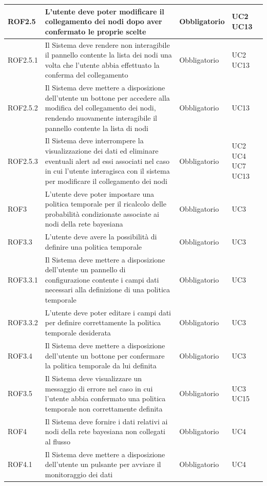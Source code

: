 \begin{center}
\begin{longtable}[c]{|m{}|m{}|m{}|m{}|}
\hline
ROF2.5 & L'utente deve poter modificare il collegamento dei nodi dopo aver confermato le proprie scelte & Obbligatorio & UC2 UC13\\
\hline
\rowcolor{grigio}ROF2.5.1 & Il Sistema deve rendere non interagibile il pannello contente la lista dei nodi una volta che l'utente abbia effettuato la conferma del collegamento & Obbligatorio & UC2 UC13\\
\hline
ROF2.5.2 & Il Sistema deve mettere a disposizione dell'utente un bottone per accedere alla modifica del collegamento dei nodi, rendendo nuovamente interagibile il pannello contente la lista di nodi & Obbligatorio & UC13\\
\hline
\rowcolor{grigio}ROF2.5.3 & Il Sistema deve interrompere la visualizzazione dei dati ed eliminare eventuali alert ad essi associati nel caso in cui l'utente interagisca con il sistema per modificare il collegamento dei nodi & Obbligatorio & UC2 UC4 UC7 UC13\\
\hline
ROF3 & L'utente deve poter impostare una politica temporale per il ricalcolo delle probabilità condizionate associate ai nodi della rete bayesiana & Obbligatorio & UC3\\
\hline
\rowcolor{grigio}ROF3.3 & L'utente deve avere la possibilità di definire una politica temporale & Obbligatorio & UC3\\ 
\hline
ROF3.3.1 & Il Sistema deve mettere a disposizione dell'utente un pannello di configurazione contente i campi dati necessari alla definizione di una politica temporale & Obbligatorio & UC3\\
\hline
\rowcolor{grigio}ROF3.3.2 & L'utente deve poter editare i campi dati per definire correttamente la politica temporale desiderata & Obbligatorio & UC3\\
\hline
ROF3.4 & Il Sistema deve mettere a disposizione dell'utente un bottone per confermare la politica temporale da lui definita & Obbligatorio & UC3\\
\hline
\rowcolor{grigio}ROF3.5 & Il Sistema deve visualizzare un messaggio di errore nel caso in cui l'utente abbia confermato una politica temporale non correttamente definita & Obbligatorio & UC3 UC15\\
\hline
ROF4 & Il Sistema deve fornire i dati relativi ai nodi della rete bayesiana non collegati al flusso & Obbligatorio & UC4\\
\hline
\rowcolor{grigio}ROF4.1 & Il Sistema deve mettere a disposizione dell'utente un pulsante per avviare il monitoraggio dei dati & Obbligatorio & UC4\\

\end{longtable}
\end{center}
